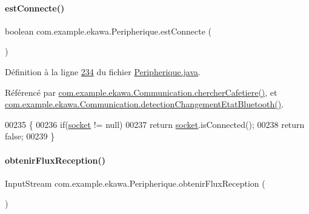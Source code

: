 \paragraph{\texorpdfstring{est\+Connecte()}{estConnecte()}}
{\footnotesize\ttfamily boolean com.\+example.\+ekawa.\+Peripherique.\+est\+Connecte (\begin{DoxyParamCaption}{ }\end{DoxyParamCaption})}



Définition à la ligne \hyperlink{_peripherique_8java_source_l00234}{234} du fichier \hyperlink{_peripherique_8java_source}{Peripherique.\+java}.



Référencé par \hyperlink{_communication_8java_source_l00276}{com.\+example.\+ekawa.\+Communication.\+chercher\+Cafetiere()}, et \hyperlink{_communication_8java_source_l00078}{com.\+example.\+ekawa.\+Communication.\+detection\+Changement\+Etat\+Bluetooth()}.


\begin{DoxyCode}
00235     \{
00236         \textcolor{keywordflow}{if}(\hyperlink{classcom_1_1example_1_1ekawa_1_1_peripherique_a00e15bc5bdafff61d45d4e39d7dd21e0}{socket} != null)
00237             \textcolor{keywordflow}{return} \hyperlink{classcom_1_1example_1_1ekawa_1_1_peripherique_a00e15bc5bdafff61d45d4e39d7dd21e0}{socket}.isConnected();
00238         \textcolor{keywordflow}{return} \textcolor{keyword}{false};
00239     \}
\end{DoxyCode}
\mbox{\label{classcom_1_1example_1_1ekawa_1_1_peripherique_a8b88d0a0d9e0c1b1aae04ba7c9d24619}} 
\paragraph{\texorpdfstring{obtenir\+Flux\+Reception()}{obtenirFluxReception()}}
{\footnotesize\ttfamily Input\+Stream com.\+example.\+ekawa.\+Peripherique.\+obtenir\+Flux\+Reception (\begin{DoxyParamCaption}{ }\end{DoxyParamCaption})}



